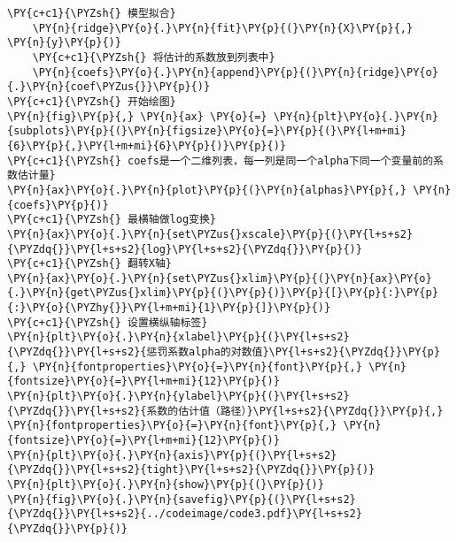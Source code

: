 \begin{Verbatim}[commandchars=\\\{\}]
    \PY{c+c1}{\PYZsh{} 模型拟合}
    \PY{n}{ridge}\PY{o}{.}\PY{n}{fit}\PY{p}{(}\PY{n}{X}\PY{p}{,} \PY{n}{y}\PY{p}{)}
    \PY{c+c1}{\PYZsh{} 将估计的系数放到列表中}
    \PY{n}{coefs}\PY{o}{.}\PY{n}{append}\PY{p}{(}\PY{n}{ridge}\PY{o}{.}\PY{n}{coef\PYZus{}}\PY{p}{)}
\PY{c+c1}{\PYZsh{} 开始绘图}
\PY{n}{fig}\PY{p}{,} \PY{n}{ax} \PY{o}{=} \PY{n}{plt}\PY{o}{.}\PY{n}{subplots}\PY{p}{(}\PY{n}{figsize}\PY{o}{=}\PY{p}{(}\PY{l+m+mi}{6}\PY{p}{,}\PY{l+m+mi}{6}\PY{p}{)}\PY{p}{)}
\PY{c+c1}{\PYZsh{} coefs是一个二维列表，每一列是同一个alpha下同一个变量前的系数估计量}
\PY{n}{ax}\PY{o}{.}\PY{n}{plot}\PY{p}{(}\PY{n}{alphas}\PY{p}{,} \PY{n}{coefs}\PY{p}{)}
\PY{c+c1}{\PYZsh{} 最横轴做log变换}
\PY{n}{ax}\PY{o}{.}\PY{n}{set\PYZus{}xscale}\PY{p}{(}\PY{l+s+s2}{\PYZdq{}}\PY{l+s+s2}{log}\PY{l+s+s2}{\PYZdq{}}\PY{p}{)}
\PY{c+c1}{\PYZsh{} 翻转X轴}
\PY{n}{ax}\PY{o}{.}\PY{n}{set\PYZus{}xlim}\PY{p}{(}\PY{n}{ax}\PY{o}{.}\PY{n}{get\PYZus{}xlim}\PY{p}{(}\PY{p}{)}\PY{p}{[}\PY{p}{:}\PY{p}{:}\PY{o}{\PYZhy{}}\PY{l+m+mi}{1}\PY{p}{]}\PY{p}{)}
\PY{c+c1}{\PYZsh{} 设置横纵轴标签}
\PY{n}{plt}\PY{o}{.}\PY{n}{xlabel}\PY{p}{(}\PY{l+s+s2}{\PYZdq{}}\PY{l+s+s2}{惩罚系数alpha的对数值}\PY{l+s+s2}{\PYZdq{}}\PY{p}{,} \PY{n}{fontproperties}\PY{o}{=}\PY{n}{font}\PY{p}{,} \PY{n}{fontsize}\PY{o}{=}\PY{l+m+mi}{12}\PY{p}{)}
\PY{n}{plt}\PY{o}{.}\PY{n}{ylabel}\PY{p}{(}\PY{l+s+s2}{\PYZdq{}}\PY{l+s+s2}{系数的估计值（路径）}\PY{l+s+s2}{\PYZdq{}}\PY{p}{,} \PY{n}{fontproperties}\PY{o}{=}\PY{n}{font}\PY{p}{,} \PY{n}{fontsize}\PY{o}{=}\PY{l+m+mi}{12}\PY{p}{)}
\PY{n}{plt}\PY{o}{.}\PY{n}{axis}\PY{p}{(}\PY{l+s+s2}{\PYZdq{}}\PY{l+s+s2}{tight}\PY{l+s+s2}{\PYZdq{}}\PY{p}{)}
\PY{n}{plt}\PY{o}{.}\PY{n}{show}\PY{p}{(}\PY{p}{)}
\PY{n}{fig}\PY{o}{.}\PY{n}{savefig}\PY{p}{(}\PY{l+s+s2}{\PYZdq{}}\PY{l+s+s2}{../codeimage/code3.pdf}\PY{l+s+s2}{\PYZdq{}}\PY{p}{)}
\end{Verbatim}
